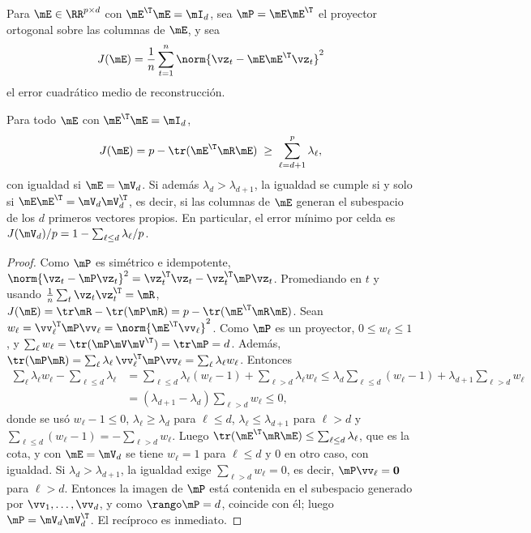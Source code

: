 Para $\mE\in\RR^{p\times d}$ con $\mE^{\T}\mE=\mI_d$, sea $\mP=\mE\mE^{\T}$ el proyector ortogonal
sobre las columnas de $\mE$, y sea
\begin{equation}\label{eq:pca}
  J(\mE)=\frac1n\sum_{t=1}^{n}\norm{\vz_t-\mE\mE^{\T}\vz_t}^2
\end{equation}
el error cuadrático medio de reconstrucción.

\begin{proposicion}\label{prop:pca}
Para todo $\mE$ con $\mE^{\T}\mE=\mI_d$,
\[
  J(\mE)=p-\tr(\mE^{\T}\mR\mE)\;\ge\;\sum_{\ell=d+1}^{p}\lambda_\ell ,
\]
con igualdad si $\mE=\mV_d$. Si además $\lambda_d>\lambda_{d+1}$, la igualdad se cumple si y solo
si $\mE\mE^{\T}=\mV_d\mV_d^{\T}$, es decir, si las columnas de $\mE$ generan el subespacio de los
$d$ primeros vectores propios. En particular, el error mínimo por celda es
$J(\mV_d)/p=1-\sum_{\ell\le d}\lambda_\ell/p$.
\end{proposicion}

\begin{proof}
Como $\mP$ es simétrico e idempotente, $\norm{\vz_t-\mP\vz_t}^2=\vz_t^{\T}\vz_t-\vz_t^{\T}\mP\vz_t$.
Promediando en $t$ y usando $\frac1n\sum_t\vz_t\vz_t^{\T}=\mR$,
$J(\mE)=\tr\mR-\tr(\mP\mR)=p-\tr(\mE^{\T}\mR\mE)$. Sean $w_\ell=\vv_\ell^{\T}\mP\vv_\ell
=\norm{\mE^{\T}\vv_\ell}^2$. Como $\mP$ es un proyector, $0\le w_\ell\le1$, y
$\sum_\ell w_\ell=\tr(\mP\mV\mV^{\T})=\tr\mP=d$. Además,
$\tr(\mP\mR)=\sum_\ell\lambda_\ell\,\vv_\ell^{\T}\mP\vv_\ell=\sum_\ell\lambda_\ell w_\ell$. Entonces
\begin{align*}
  \sum_{\ell}\lambda_\ell w_\ell-\sum_{\ell\le d}\lambda_\ell
  &=\sum_{\ell\le d}\lambda_\ell(w_\ell-1)+\sum_{\ell>d}\lambda_\ell w_\ell
  \le\lambda_d\sum_{\ell\le d}(w_\ell-1)+\lambda_{d+1}\sum_{\ell>d}w_\ell\\
  &=(\lambda_{d+1}-\lambda_d)\sum_{\ell>d}w_\ell\le0,
\end{align*}
donde se usó $w_\ell-1\le0$, $\lambda_\ell\ge\lambda_d$ para $\ell\le d$, $\lambda_\ell\le
\lambda_{d+1}$ para $\ell>d$ y $\sum_{\ell\le d}(w_\ell-1)=-\sum_{\ell>d}w_\ell$. Luego
$\tr(\mE^{\T}\mR\mE)\le\sum_{\ell\le d}\lambda_\ell$, que es la cota, y con $\mE=\mV_d$ se tiene
$w_\ell=1$ para $\ell\le d$ y $0$ en otro caso, con igualdad. Si $\lambda_d>\lambda_{d+1}$, la
igualdad exige $\sum_{\ell>d}w_\ell=0$, es decir, $\mP\vv_\ell=\mathbf{0}$ para $\ell>d$. Entonces la
imagen de $\mP$ está contenida en el subespacio generado por $\vv_1,\dots,\vv_d$, y como
$\rango\mP=d$, coincide con él; luego $\mP=\mV_d\mV_d^{\T}$. El recíproco es inmediato.
\end{proof}

